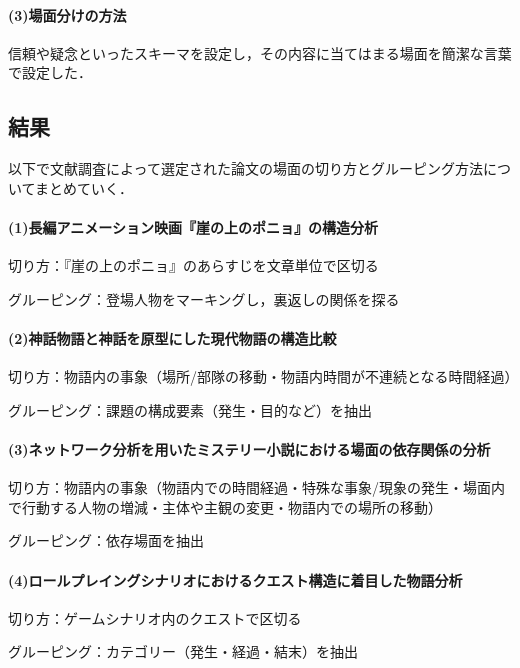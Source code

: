 \paragraph*{(3)場面分けの方法}
信頼や疑念といったスキーマを設定し，その内容に当てはまる場面を簡潔な言葉で設定した．

\subsection{結果}


以下で文献調査によって選定された論文の場面の切り方とグルーピング方法についてまとめていく．

\paragraph*{(1)長編アニメーション映画『崖の上のポニョ』の構造分析\cite{ponyo}}

切り方：『崖の上のポニョ』のあらすじを文章単位で区切る

グルーピング：登場人物をマーキングし，裏返しの関係を探る

\paragraph*{(2)神話物語と神話を原型にした現代物語の構造比較\cite{sinwa}}

切り方：物語内の事象（場所/部隊の移動・物語内時間が不連続となる時間経過）

グルーピング：課題の構成要素（発生・目的など）を抽出

\paragraph*{(3)ネットワーク分析を用いたミステリー小説における場面の依存関係の分析\cite{misuteri}}

切り方：物語内の事象（物語内での時間経過・特殊な事象/現象の発生・場面内で行動する人物の増減・主体や主観の変更・物語内での場所の移動）

グルーピング：依存場面を抽出

\paragraph*{(4)ロールプレイングシナリオにおけるクエスト構造に着目した物語分析\cite{rpg}}

切り方：ゲームシナリオ内のクエストで区切る

グルーピング：カテゴリー（発生・経過・結末）を抽出

